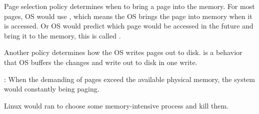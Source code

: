 
    Page selection policy determines when to bring a page into the memory. For most 
    pages, OS would use , which means the OS brings the 
    page into memory when it is accessed. Or OS would predict which page would be 
    accessed in the future and bring it to the memory, this is called .

    Another policy determines how the OS writes pages out to disk.
     is a behavior that OS buffers the changes and write out to disk
    in one write.


    : When the demanding of pages exceed the available physical memory,
    the system would constantly being paging.

    Linux would ran  to choose some memory-intensive process
    and kill them.